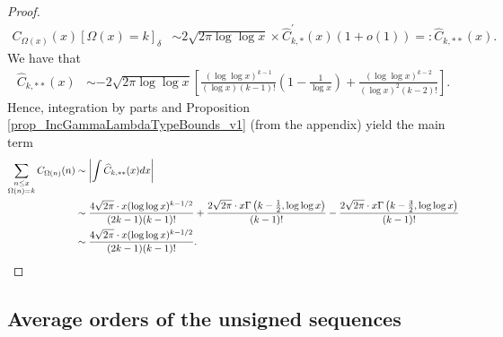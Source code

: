 \documentclass[11pt,reqno,a4letter]{article}
\numberwithin{figure}{section}
\numberwithin{table}{section}
\newcommand{\Iverson}[1]{\ensuremath{\left[#1\right]_{\delta}}}
\theoremstyle{plain}
\numberwithin{theorem}{section}
\theoremstyle{definition}
\begin{document}
\begin{proof}
\begin{align*}
     C_{\Omega(x)}(x) \Iverson{\Omega(x) = k} & \sim 
     2 \sqrt{2\pi \log\log x} \times \widehat{C}_{k,\ast}^{\prime}(x) (1+o(1)) 
     =: \widehat{C}_{k,\ast\ast}(x). 
\end{align*} 
We have that 
\begin{align*}
     \widehat{C}_{k,\ast\ast}(x) & \sim 
     -2\sqrt{2\pi \log\log x}\left[ 
     \frac{(\log\log x)^{k-1}}{(\log x) (k-1)!} \left( 
     1 - \frac{1}{\log x}\right) + 
     \frac{(\log\log x)^{k-2}}{(\log x)^2 (k-2)!}\right]. 
\end{align*} 
Hence, integration by parts and Proposition \ref{prop_IncGammaLambdaTypeBounds_v1} 
(from the appendix) yield the main term 
\begin{align}
\label{eqn_proofTag_CkAstAstHatx_DerivativeFormula_NeedsIBP_v1} 
\sum_{\substack{n \leq x \\ \Omega(n)=k}} C_{\Omega(n)}(n) & \sim
     \left\lvert \int \widehat{C}_{k,\ast\ast}(x)dx \right\rvert \\ 
\notag
     & \sim 
     \frac{4\sqrt{2\pi} \cdot x (\log\log x)^{k-1/2}}{(2k-1) (k-1)!} + 
     \frac{2\sqrt{2\pi} \cdot x \Gamma\left(k - \frac{1}{2}, \log\log x\right)}{(k-1)!} - 
     \frac{2\sqrt{2\pi} \cdot x \Gamma\left(k - \frac{3}{2}, \log\log x\right)}{(k-1)!} \\ 
     & \sim \frac{4\sqrt{2\pi} \cdot x (\log\log x)^{k-1/2}}{(2k-1) (k-1)!}. 
     \qedhere 
\end{align}
\end{proof}

\subsection{Average orders of the unsigned sequences}
\label{subSection_AvgOrdersOfTheUnsignedSequences} 
\end{document}
